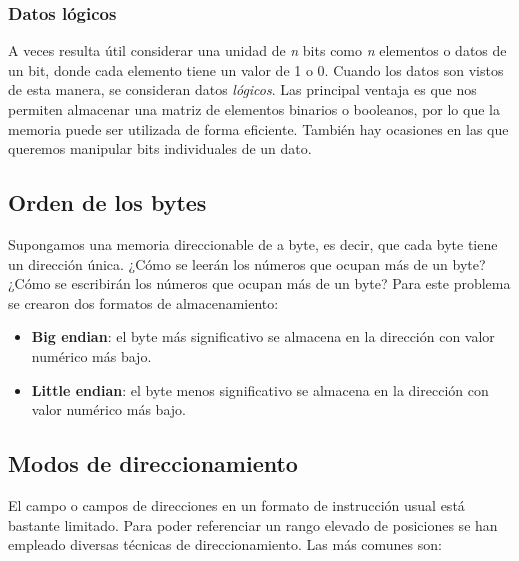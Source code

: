 \begin{subs}
  \subsubsection{Datos lógicos}

  A veces resulta útil considerar una unidad de \textit{n} bits como \textit{n} elementos o datos de un bit, donde cada elemento tiene un valor de 1 o 0. Cuando los datos son vistos de esta manera, se consideran datos \textit{lógicos}.
  Las principal ventaja es que nos permiten almacenar una matriz de elementos binarios o booleanos, por lo que la memoria puede ser utilizada de forma eficiente. También hay ocasiones en las que queremos manipular bits individuales de un dato.
\end{subs}

\subsection{Orden de los bytes}

Supongamos una memoria direccionable de a byte, es decir, que cada byte tiene un dirección única. ¿Cómo se leerán los números que ocupan más de un byte? ¿Cómo se escribirán los números que ocupan más de un byte? 
Para este problema se crearon dos formatos de almacenamiento:

\begin{itemize}
  \item \textbf{Big endian}: el byte más significativo se almacena en la dirección con valor numérico más bajo.
  \item \textbf{Little endian}: el byte menos significativo se almacena en la dirección con valor numérico más bajo.
\end{itemize}

\begin{figure}[H]
  \hspace*{\fill}
  \hfill
  \hspace*{\fill}
\end{figure}

\subsection{Modos de direccionamiento}

El campo o campos de direcciones en un formato de instrucción usual está bastante limitado. Para poder referenciar un rango elevado de posiciones se han empleado diversas técnicas de direccionamiento. Las más comunes son:

